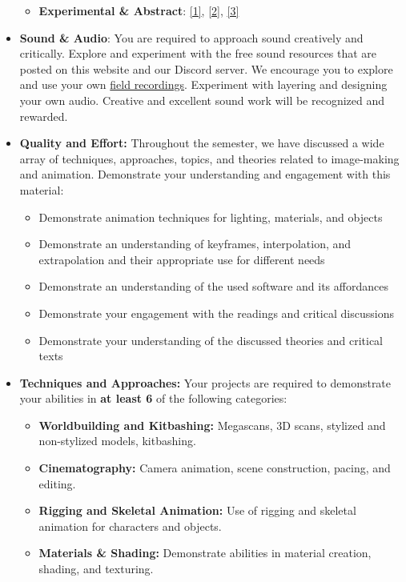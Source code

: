 \begin{itemize}
\begin{itemize}
		      \item \textbf{Experimental \& Abstract}: \href{https://vimeo.com/275668389}{[1]}, \href{https://vimeo.com/238456535}{[2]}, \href{https://vimeo.com/291430458}{[3]}
	      \end{itemize}
	\item \textbf{Sound \& Audio}: You are required to approach sound creatively and critically. Explore and experiment with the free sound resources that are posted on this website and our Discord server. We encourage you to explore and use your own \href{https://en.wikipedia.org/wiki/Field_recording}{field recordings}. Experiment with layering and designing your own audio. Creative and excellent sound work will be recognized and rewarded.
	\item \textbf{Quality and Effort:} Throughout the semester, we have discussed a wide array of techniques, approaches, topics, and theories related to image-making and animation. Demonstrate your understanding and engagement with this material:
	      \begin{itemize}
		      \item Demonstrate animation techniques for lighting, materials, and objects
		      \item Demonstrate an understanding of keyframes, interpolation, and extrapolation and their appropriate use for different needs
		      \item Demonstrate an understanding of the used software and its affordances
		      \item Demonstrate your engagement with the readings and critical discussions
		      \item Demonstrate your understanding of the discussed theories and critical texts
	      \end{itemize}
	\item \textbf{Techniques and Approaches:} Your projects are required to demonstrate your abilities in \textbf{at least 6} of the following categories:
	      \begin{itemize}
		      \item \textbf{Worldbuilding and Kitbashing:} Megascans, 3D scans, stylized and non-stylized models, kitbashing.
		      \item \textbf{Cinematography:} Camera animation, scene construction, pacing, and editing.
		      \item \textbf{Rigging and Skeletal Animation:} Use of rigging and skeletal animation for characters and objects.
		      \item \textbf{Materials \& Shading:} Demonstrate abilities  in material creation, shading, and texturing.

\end{itemize}
\end{itemize}
